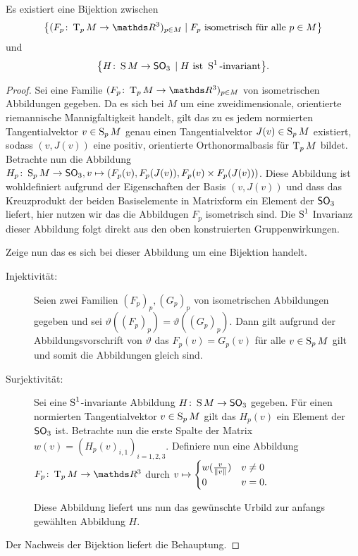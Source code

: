 \begin{Satz}\label{satz:s1}
  Es existiert eine Bijektion zwischen
  \begin{gather*}
    \set{ (\abb{F_p}{\TT_pM}{\R^3})_{p\in M} }{ F_p \text{ isometrisch
        für alle }p \in M}
  \end{gather*}
  und
  \begin{gather*}
    \set{ \abb{H}{\S M}{\so_3}}{H\text{ ist }\S^1 \text{-invariant}}.
  \end{gather*}
  \begin{proof}
    Sei eine Familie $(\abb{F_p}{\TT_pM}{\R^3})_{p\in M}$ von
    isometrischen Abbildungen gegeben.  Da es sich bei $M$ um eine
    zweidimensionale, orientierte riemannische Mannigfaltigkeit
    handelt, gilt das zu es jedem normierten Tangentialvektor
    $v \in \S_p M$ genau einen Tangentialvektor $J(v) \in \S_p M$
    existiert, sodass $(v,J(v))$ eine positiv, orientierte
    Orthonormalbasis für $\tang{p}{M}$ bildet. Betrachte nun die
    Abbildung $\abb{H_p}{\S_p%
      M}{\so_3}, v \mapsto (F_p(v),F_p(J(v)),F_p(v)\times F_p(J(v)))$.
    Diese Abbildung ist wohldefiniert aufgrund der Eigenschaften der
    Basis $(v,J(v))$ und dass das Kreuzprodukt der beiden
    Basiselemente in Matrixform ein Element der $\so_3$ liefert, hier nutzen wir das die Abbildugen $ F_p $ isometrisch sind.  Die
    $\S^1$ Invarianz dieser Abbildung folgt direkt aus den oben
    konstruierten Gruppenwirkungen.   
	
    Zeige nun das es sich bei dieser Abbildung um eine Bijektion
    handelt.
    \begin{description}
    \item[Injektivität:] Seien zwei Familien $(F_p)_p,(G_p)_p$ von
      isometrischen Abbildungen gegeben und sei
      $\vartheta((F_p)_p)=\vartheta((G_p)_p)$. Dann gilt aufgrund der
      Abbildungsvorschrift von $\vartheta$ das $F_p(v)=G_p(v)$ für
      alle $v \in \S_p M$ gilt und somit die Abbildungen gleich sind.
    \item[Surjektivität:] Sei eine $\S^1$-invariante Abbildung
      $\abb{H}{\S M}{\so_3}$ gegeben. Für einen normierten
      Tangentialvektor $v \in \S_p M$ gilt das $H_p(v)$ ein Element
      der $\so_3$ ist. Betrachte nun die erste Spalte der Matrix
      $w(v)=(H_p(v)_{i,1})_{i=1,2,3}$. Definiere nun eine Abbildung
      $\abb{F_p}{\tang{p}{M}}{\R^3}$ durch $v \mapsto \begin{cases}
        w(\frac{v}{\norm{v}}) & v \neq 0 \\
        0 & v=0.
      \end{cases}$
		
      Diese Abbildung liefert uns nun das gewünschte Urbild zur
      anfangs gewählten Abbildung $H$.
    \end{description}
    Der Nachweis der Bijektion liefert die Behauptung.
\end{proof}

\end{Satz}

